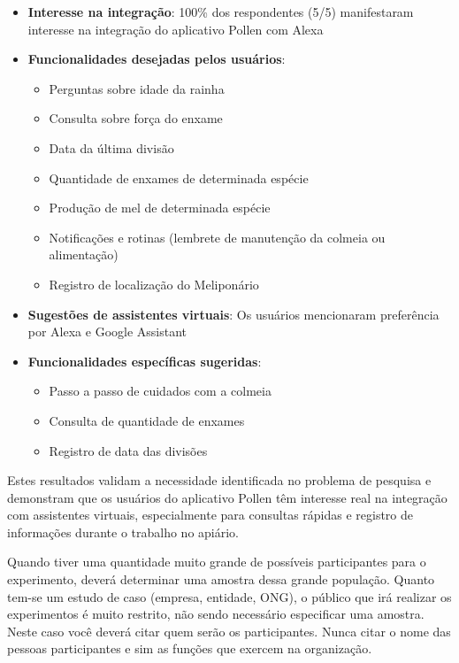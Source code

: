 \begin{itemize}
    \item \textbf{Interesse na integração}: 100\% dos respondentes (5/5) manifestaram interesse na integração do aplicativo Pollen com Alexa
    \item \textbf{Funcionalidades desejadas pelos usuários}:
    \begin{itemize}
        \item Perguntas sobre idade da rainha
        \item Consulta sobre força do enxame
        \item Data da última divisão
        \item Quantidade de enxames de determinada espécie
        \item Produção de mel de determinada espécie
        \item Notificações e rotinas (lembrete de manutenção da colmeia ou alimentação)
        \item Registro de localização do Meliponário
    \end{itemize}
    \item \textbf{Sugestões de assistentes virtuais}: Os usuários mencionaram preferência por Alexa e Google Assistant
    \item \textbf{Funcionalidades específicas sugeridas}:
    \begin{itemize}
        \item Passo a passo de cuidados com a colmeia
        \item Consulta de quantidade de enxames
        \item Registro de data das divisões
    \end{itemize}
\end{itemize}

Estes resultados validam a necessidade identificada no problema de pesquisa e demonstram que os usuários do aplicativo Pollen têm interesse real na integração com assistentes virtuais, especialmente para consultas rápidas e registro de informações durante o trabalho no apiário.

Quando tiver uma quantidade muito grande de possíveis participantes para o experimento, deverá determinar uma amostra dessa grande população. Quanto tem-se um estudo de caso (empresa, entidade, ONG), o público que irá realizar os experimentos é muito restrito, não sendo necessário especificar uma amostra. Neste caso você deverá citar quem serão os participantes. Nunca citar o nome das pessoas participantes e sim as funções que exercem na organização.

